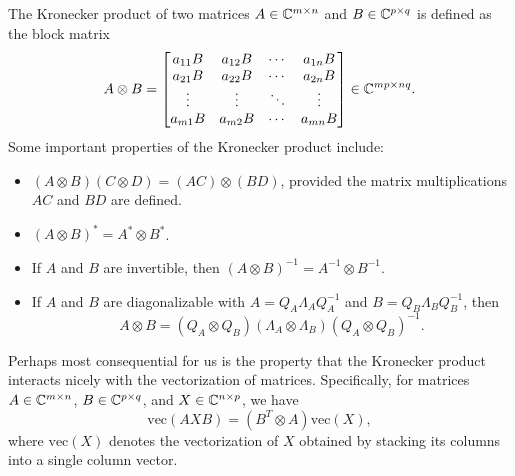 The Kronecker product of two matrices $A \in \mathbb{C}^{m \times n}$ and $B \in \mathbb{C}^{p \times q}$ is defined as the block matrix
\begin{equation*}
    A \otimes B = \begin{bmatrix}
        a_{11} B & a_{12} B & \cdots & a_{1n} B \\
        a_{21} B & a_{22} B & \cdots & a_{2n} B \\
        \vdots & \vdots & \ddots & \vdots \\
        a_{m1} B & a_{m2} B & \cdots & a_{mn} B
    \end{bmatrix} \in \mathbb{C}^{mp \times nq}.
\end{equation*}
Some important properties of the Kronecker product include:
\begin{itemize}
    \item $(A \otimes B)(C \otimes D) = (AC) \otimes (BD)$, provided the matrix multiplications $AC$ and $BD$ are defined.
    \item $(A \otimes B)^* = A^* \otimes B^*$.
    \item If $A$ and $B$ are invertible, then $(A \otimes B)^{-1} = A^{-1} \otimes B^{-1}$.
    \item If $A$ and $B$ are diagonalizable with $A = Q_A \Lambda_A Q_A^{-1}$ and $B = Q_B \Lambda_B Q_B^{-1}$, then
    \begin{equation*}
        A \otimes B = (Q_A \otimes Q_B)(\Lambda_A \otimes \Lambda_B)(Q_A \otimes Q_B)^{-1}.
    \end{equation*}
\end{itemize}
Perhaps most consequential for us is the property that the Kronecker product interacts nicely with the vectorization of matrices. Specifically, for matrices $A \in \mathbb{C}^{m \times n}$, $B \in \mathbb{C}^{p \times q}$, and $X \in \mathbb{C}^{n \times p}$, we have
\begin{equation}\label{eq:vec-kronecker}
    \text{vec}(AXB) = (B^T \otimes A) \text{vec}(X),
\end{equation}
where $\text{vec}(X)$ denotes the vectorization of $X$ obtained by stacking its columns into a single column vector.










